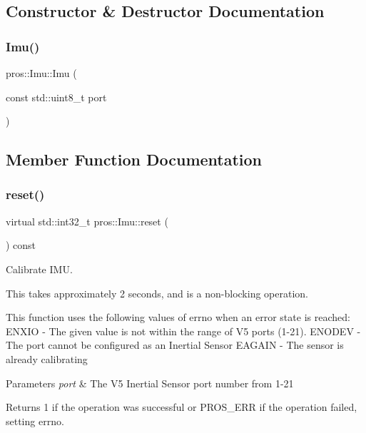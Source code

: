 \subsection{Constructor \& Destructor Documentation}
\mbox{\label{classpros_1_1Imu_aac194322ec0563c1c73f540733e7cc4e}} 
\subsubsection{\texorpdfstring{Imu()}{Imu()}}
{\footnotesize\ttfamily pros\+::\+Imu\+::\+Imu (\begin{DoxyParamCaption}\item[{const std\+::uint8\+\_\+t}]{port }\end{DoxyParamCaption})\hspace{0.3cm}{\ttfamily [inline]}}



\subsection{Member Function Documentation}
\mbox{\label{classpros_1_1Imu_ad7973cfad5f8f83e7007342055197c43}} 
\subsubsection{\texorpdfstring{reset()}{reset()}}
{\footnotesize\ttfamily virtual std\+::int32\+\_\+t pros\+::\+Imu\+::reset (\begin{DoxyParamCaption}{ }\end{DoxyParamCaption}) const\hspace{0.3cm}{\ttfamily [virtual]}}



Calibrate I\+MU. 

This takes approximately 2 seconds, and is a non-\/blocking operation.

This function uses the following values of errno when an error state is reached\+: E\+N\+X\+IO -\/ The given value is not within the range of V5 ports (1-\/21). E\+N\+O\+D\+EV -\/ The port cannot be configured as an Inertial Sensor E\+A\+G\+A\+IN -\/ The sensor is already calibrating


\begin{DoxyParams}{Parameters}
{\em port} & The V5 Inertial Sensor port number from 1-\/21 \\
\hline
\end{DoxyParams}
\begin{DoxyReturn}{Returns}
1 if the operation was successful or P\+R\+O\+S\+\_\+\+E\+RR if the operation failed, setting errno. 
\end{DoxyReturn}
\mbox{\label{classpros_1_1Imu_ac8bd7a19a6b4fc0c207a895efd3f0b48}} 
